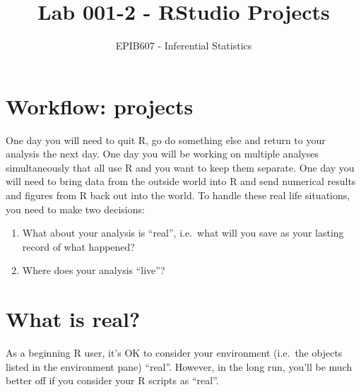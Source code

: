 \documentclass[letterpaper,12pt,twoside,]{pinp}
\title{Lab 001-2 - RStudio Projects}
\author[a]{EPIB607 - Inferential Statistics}
\affil[a]{Fall 2020, McGill University}
\begin{document}
\verticaladjustment{-2pt}

\maketitle
\thispagestyle{firststyle}



\tableofcontents

\hypertarget{workflow-projects}{%
\section{Workflow: projects}\label{workflow-projects}}

One day you will need to quit R, go do something else and return to your
analysis the next day. One day you will be working on multiple analyses
simultaneously that all use R and you want to keep them separate. One
day you will need to bring data from the outside world into R and send
numerical results and figures from R back out into the world. To handle
these real life situations, you need to make two decisions:

\begin{enumerate}
\def\labelenumi{\arabic{enumi}.}
\item
  What about your analysis is ``real'', i.e.~what will you save as your
  lasting record of what happened?
\item
  Where does your analysis ``live''?
\end{enumerate}

\hypertarget{what-is-real}{%
\section{What is real?}\label{what-is-real}}

As a beginning R user, it's OK to consider your environment (i.e.~the
objects listed in the environment pane) ``real''. However, in the long
run, you'll be much better off if you consider your R scripts as
``real''.
\end{document}
